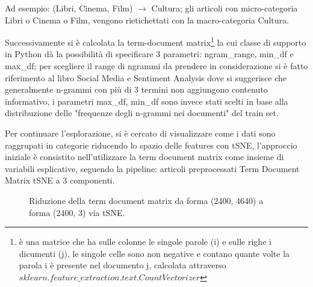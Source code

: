 \documentclass[runningheads]{llncs}
\begin{document}
Ad esempio:  (Libri, Cinema, Film) $\rightarrow $ Cultura; gli articoli con micro-categoria Libri o Cinema o Film, vengono rietichettati con la macro-categoria Cultura.

Successivamente si \`e calcolata la term-document matrix\footnote{\`e una matrice che ha sulle colonne le singole parole (i) e sulle righe i dicumenti (j), le singole celle sono non negative e contano quante volte la parola i \`e presente nel documento j, calcolata attraverso    $sklearn.feature\_extraction.text.CountVectorizer$}  la cui classe di supporto in Python d\`a la possibilit\`a di specificare 3 parametri: ngram\_range, min\_df e max\_df; per scegliere il
range di ngrammi da prendere in considerazione si \`e fatto riferimento al libro Social Media e Sentiment Analysis\cite{NGRAM} dove si suggerisce che generalmente n-grammi con pi\`u di 3 termini non aggiungono contenuto informativo, i parametri max\_df, min\_df sono invece stati scelti in base alla distribuzione delle "frequenze degli n-grammi nei documenti" del train set.


Per continuare l'esplorazione, si \`e cercato di visualizzare come i dati sono raggrupati in categorie riducendo lo spazio delle features con tSNE, l'approccio iniziale \`e consistito nell'utilizzare la term document matrix
come insieme di variabili esplicative, seguendo la pipeline: articoli preprocessati \textpipe Term Document Matrix \textpipe tSNE a 3 componenti.

\begin{figure}%
    \centering
    \qquad
    \caption{Riduzione della term document matrix da forma (2400, 4640) a forma (2400, 3) via tSNE. }%
    \label{fig:tsne1}%
\end{figure}
\end{document}
